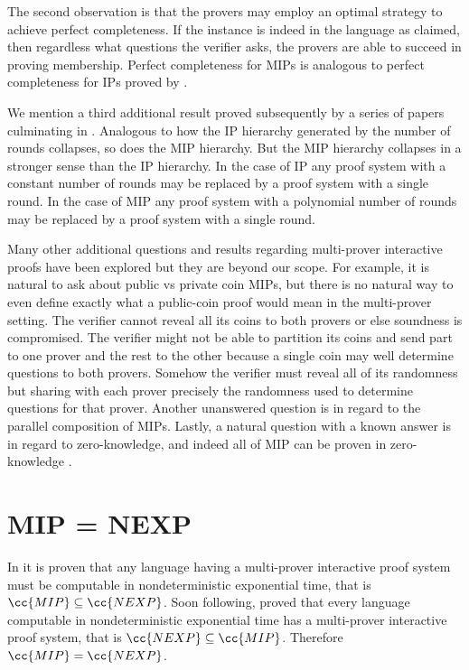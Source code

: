 The second observation is that the provers may employ an optimal strategy to achieve perfect completeness.
If the instance is indeed in the language as claimed, then regardless what questions the verifier asks, the provers are able to succeed in proving membership.
Perfect completeness for MIPs is analogous to perfect completeness for IPs proved by \cite{FGM+89}.

We mention a third additional result proved subsequently by a series of papers culminating in \cite{FL92}.
Analogous to how the IP hierarchy generated by the number of rounds collapses, so does the MIP hierarchy.
But the MIP hierarchy collapses in a stronger sense than the IP hierarchy.
In the case of IP any proof system with a constant number of rounds may be replaced by a proof system with a single round.
In the case of MIP any proof system with a polynomial number of rounds may be replaced by a proof system with a single round.

Many other additional questions and results regarding multi-prover interactive proofs have been explored but they are beyond our scope.
For example, it is natural to ask about public vs private coin MIPs, but there is no natural way to even define exactly what a public-coin proof would mean in the multi-prover setting.
The verifier cannot reveal all its coins to both provers or else soundness is compromised.
The verifier might not be able to partition its coins and send part to one prover and the rest to the other because a single coin may well determine questions to both provers.
Somehow the verifier must reveal all of its randomness but sharing with each prover precisely the randomness used to determine questions for that prover.
Another unanswered question is in regard to the parallel composition of MIPs.
Lastly, a natural question with a known answer is in regard to zero-knowledge, and indeed all of MIP can be proven in zero-knowledge \cite{FK94}.


\section{MIP = NEXP}

In \cite{FRS88} it is proven that any language having a multi-prover interactive proof system must be computable in nondeterministic exponential time, that is $\cc{MIP}\subseteq\cc{NEXP}$.
Soon following, \cite{BFL91} proved that every language computable in nondeterministic exponential time has a multi-prover interactive proof system, that is $\cc{NEXP}\subseteq\cc{MIP}$.
Therefore $\cc{MIP}=\cc{NEXP}$.


